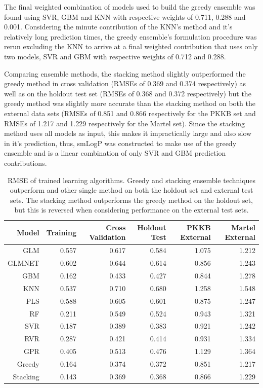 \documentclass[10pt]{bmc_article}
\newenvironment{bmcformat}{\begin{raggedright}\baselineskip20pt\sloppy\setboolean{publ}{false}}{\end{raggedright}\baselineskip20pt\sloppy}
\begin{document}
\begin{bmcformat}
The final weighted combination of models used to build the greedy ensemble was found using SVR, GBM and KNN with respective weights of 0.711, 0.288 and 0.001. Considering the minute contribution of the KNN's method and it's relatively long prediction times, the greedy ensemble's formulation procedure was rerun excluding the KNN to arrive at a final weighted contribution that uses only two models, SVR and GBM with respective weights of 0.712 and 0.288.

Comparing ensemble methods, the stacking method slightly outperformed the greedy method in cross validation (RMSEs of 0.369 and 0.374 respectively) as well as on the holdout test set (RMSEs of 0.368 and 0.372 respectively) but the greedy method was slightly more accurate than the stacking method on both the external data sets (RMSEs of 0.851 and 0.866 respectively for the PKKB set and RMSEs of 1.217 and 1.229 respectively for the Martel set). Since the stacking method uses all models as input, this makes it impractically large and also slow in it's prediction, thus, smLogP was constructed to make use of the greedy ensemble and is a linear combination of only SVR and GBM prediction contributions.

\begin{table}[htbp]
  \centering
  \caption{RMSE of trained learning algorithms. Greedy and stacking ensemble techniques outperform and other single method on both the holdout set and external test sets. The stacking method outperforms the greedy method on the holdout set, but this is reversed when considering performance on the external test sets.}
    \begin{tabular}{rrrrrr}
    \toprule
    Model & Training & Cross Validation & Holdout Test & PKKB External & Martel External \\
    \midrule
    GLM   & 0.557 & 0.617 & 0.584 & 1.075 & 1.212 \\
    GLMNET & 0.602 & 0.644 & 0.614 & 0.856 & 1.243 \\
    GBM   & 0.162 & 0.433 & 0.427 & 0.844 & 1.278 \\
    KNN   & 0.537 & 0.710 & 0.680 & 1.258 & 1.548 \\
    PLS   & 0.588 & 0.605 & 0.601 & 0.875 & 1.247 \\
    RF    & 0.211 & 0.549 & 0.524 & 0.943 & 1.321 \\
    SVR   & 0.187 & 0.389 & 0.383 & 0.921 & 1.242 \\
    RVR   & 0.287 & 0.421 & 0.414 & 0.931 & 1.334 \\
    GPR   & 0.405 & 0.513 & 0.476 & 1.129 & 1.364 \\
    Greedy & 0.164 & 0.374 & 0.372 & 0.851 & 1.217 \\
    Stacking & 0.143 & 0.369 & 0.368 & 0.866 & 1.229 \\
    \bottomrule
    \end{tabular}
  \label{tab:comparison}
\end{table}


\end{bmcformat}
\end{document}
